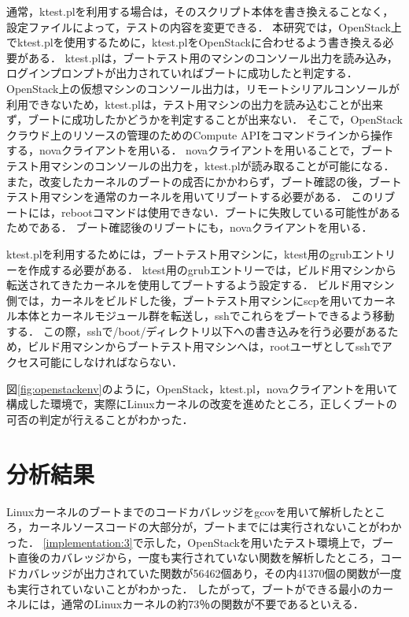 \documentclass[graduation-thesis]{mlarticle}
\begin{document}
通常，ktest.plを利用する場合は，そのスクリプト本体を書き換えることなく，設定ファイルによって，テストの内容を変更できる．
本研究では，OpenStack上でktest.plを使用するために，ktest.plをOpenStackに合わせるよう書き換える必要がある．
ktest.plは，ブートテスト用のマシンのコンソール出力を読み込み，ログインプロンプトが出力されていればブートに成功したと判定する．
OpenStack上の仮想マシンのコンソール出力は，リモートシリアルコンソールが利用できないため，ktest.plは，テスト用マシンの出力を読み込むことが出来ず，ブートに成功したかどうかを判定することが出来ない．
そこで，OpenStackクラウド上のリソースの管理のためのCompute APIをコマンドラインから操作する，novaクライアントを用いる．
novaクライアントを用いることで，ブートテスト用マシンのコンソールの出力を，ktest.plが読み取ることが可能になる．
また，改変したカーネルのブートの成否にかかわらず，ブート確認の後，ブートテスト用マシンを通常のカーネルを用いてリブートする必要がある．
このリブートには，rebootコマンドは使用できない．ブートに失敗している可能性があるためである．
ブート確認後のリブートにも，novaクライアントを用いる．

ktest.plを利用するためには，ブートテスト用マシンに，ktest用のgrubエントリーを作成する必要がある．
ktest用のgrubエントリーでは，ビルド用マシンから転送されてきたカーネルを使用してブートするよう設定する．
ビルド用マシン側では，カーネルをビルドした後，ブートテスト用マシンにscpを用いてカーネル本体とカーネルモジュール群を転送し，sshでこれらをブートできるよう移動する．
この際，sshで/boot/ディレクトリ以下への書き込みを行う必要があるため，ビルド用マシンからブートテスト用マシンへは，rootユーザとしてsshでアクセス可能にしなければならない．

図\ref{fig:openstackenv}のように，OpenStack，ktest.pl，novaクライアントを用いて構成した環境で，実際にLinuxカーネルの改変を進めたところ，正しくブートの可否の判定が行えることがわかった．

\clearpage
\section{分析結果}
\label{result}

Linuxカーネルのブートまでのコードカバレッジをgcovを用いて解析したところ，カーネルソースコードの大部分が，ブートまでには実行されないことがわかった．
\ref{implementation:3}で示した，OpenStackを用いたテスト環境上で，ブート直後のカバレッジから，一度も実行されていない関数を解析したところ，コードカバレッジが出力されていた関数が56462個あり，その内41370個の関数が一度も実行されていないことがわかった．
したがって，ブートができる最小のカーネルには，通常のLinuxカーネルの約73％の関数が不要であるといえる．
\end{document}
